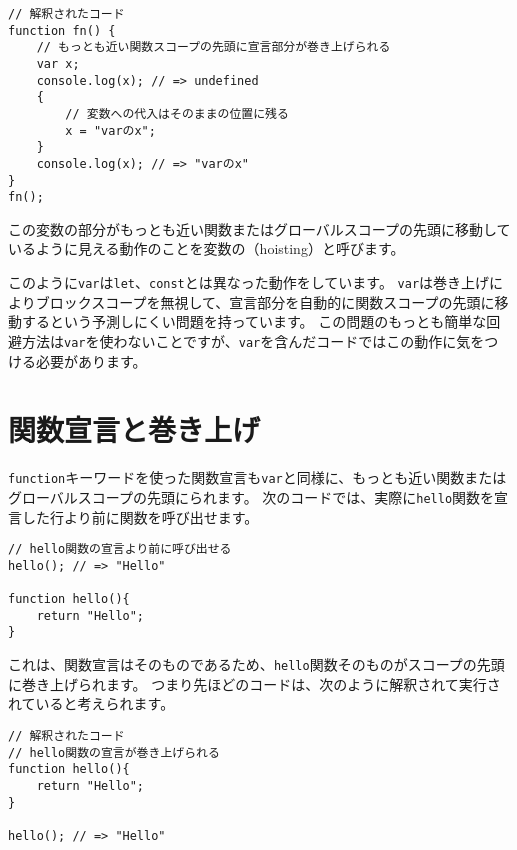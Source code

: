 \begin{lstlisting}
// 解釈されたコード
function fn() {
    // もっとも近い関数スコープの先頭に宣言部分が巻き上げられる
    var x;
    console.log(x); // => undefined
    {
        // 変数への代入はそのままの位置に残る
        x = "varのx";
    }
    console.log(x); // => "varのx"
}
fn();
\end{lstlisting}

この変数の\textbf{}部分がもっとも近い関数またはグローバルスコープの先頭に移動しているように見える動作のことを変数の\textbf{}（hoisting）と呼びます。

このように\texttt{var}は\texttt{let}、\texttt{const}とは異なった動作をしています。
\texttt{var}は巻き上げによりブロックスコープを無視して、宣言部分を自動的に関数スコープの先頭に移動するという予測しにくい問題を持っています。
この問題のもっとも簡単な回避方法は\texttt{var}を使わないことですが、\texttt{var}を含んだコードではこの動作に気をつける必要があります。

\hypertarget{function-declaration-hoisting}{%
\section{関数宣言と巻き上げ}\label{function-declaration-hoisting}}

\texttt{function}キーワードを使った関数宣言も\texttt{var}と同様に、もっとも近い関数またはグローバルスコープの先頭に\textbf{}られます。
次のコードでは、実際に\texttt{hello}関数を宣言した行より前に関数を呼び出せます。

\begin{lstlisting}
// hello関数の宣言より前に呼び出せる
hello(); // => "Hello"

function hello(){
    return "Hello";
}
\end{lstlisting}

これは、関数宣言は\textbf{}そのものであるため、\texttt{hello}関数そのものがスコープの先頭に巻き上げられます。
つまり先ほどのコードは、次のように解釈されて実行されていると考えられます。

\begin{lstlisting}
// 解釈されたコード
// hello関数の宣言が巻き上げられる
function hello(){
    return "Hello";
}

hello(); // => "Hello"
\end{lstlisting}

